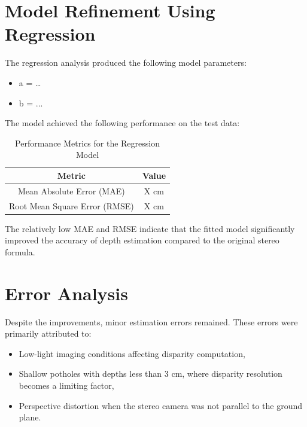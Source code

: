 \section{Model Refinement Using Regression}
The regression analysis produced the following model parameters:
\begin{itemize}
	\item a = …
	\item b = ...
\end{itemize}

The model achieved the following performance on the test data:

\begin{table}[H]
	\centering
	\begin{tabular}{|c|c|}
		\hline
		\textbf{Metric} & \textbf{Value} \\ \hline
		Mean Absolute Error (MAE) & X cm \\ \hline
		Root Mean Square Error (RMSE) & X cm \\ \hline
	\end{tabular}
	\caption{Performance Metrics for the Regression Model}
	\label{tab:performance_metrics}
\end{table}

The relatively low MAE and RMSE indicate that the fitted model significantly improved the accuracy of depth estimation compared to the original stereo formula.


\section{Error Analysis}
Despite the improvements, minor estimation errors remained. These errors were primarily attributed to:
\begin{itemize}
	\item Low-light imaging conditions affecting disparity computation,
	\item Shallow potholes with depths less than 3 cm, where disparity resolution becomes a limiting factor,
	\item Perspective distortion when the stereo camera was not parallel to the ground plane.
\end{itemize}


